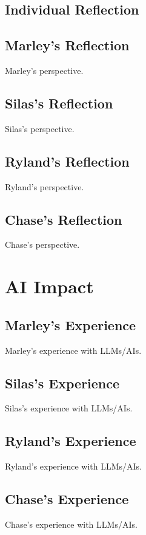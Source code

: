 \documentclass[12pt]{article}
\begin{document}
\subsection{Individual Reflection}
\subsection{Marley's Reflection}
Marley's perspective.

\subsection{Silas's Reflection}
Silas's perspective.

\subsection{Ryland's Reflection}
Ryland's perspective.

\subsection{Chase's Reflection}
Chase's perspective.

\newpage
\section{AI Impact}

\subsection{Marley's Experience}
Marley's experience with LLMs/AIs.

\subsection{Silas's Experience}
Silas's experience with LLMs/AIs.

\subsection{Ryland's Experience}
Ryland's experience with LLMs/AIs.

\subsection{Chase's Experience}
Chase's experience with LLMs/AIs.
\end{document}
